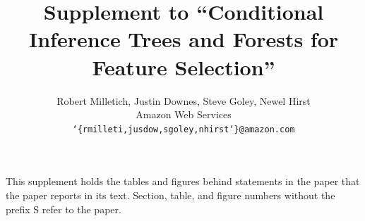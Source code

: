 \documentclass[11pt]{article}
\title{Supplement to ``Conditional Inference Trees and Forests for Feature Selection''}
\author{%
  Robert Milletich, Justin Downes, Steve Goley, Newel Hirst\\
  Amazon Web Services\\
  \texttt{\char`\{rmilleti,jusdow,sgoley,nhirst\char`\}@amazon.com}
}
\date{}
\begin{document}
\maketitle

This supplement holds the tables and figures behind statements in the paper
that the paper reports in its text. Section, table, and figure numbers without
the prefix S refer to the paper.


\FloatBarrier

\FloatBarrier

\FloatBarrier

\end{document}
